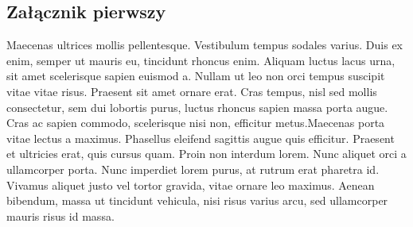 \documentclass[polish,engineering]{wizthesis}
\begin{document}
\listoffigures

\listoftables

\listoflistings

\begin{appendices}

\chapter{Załącznik pierwszy}

Maecenas ultrices mollis pellentesque. Vestibulum tempus sodales varius. Duis ex
enim, semper ut mauris eu, tincidunt rhoncus enim. Aliquam luctus lacus urna,
sit amet scelerisque sapien euismod a. Nullam ut leo non orci tempus suscipit
vitae vitae risus. Praesent sit amet ornare erat. Cras tempus, nisl sed mollis
consectetur, sem dui lobortis purus, luctus rhoncus sapien massa porta augue.
Cras ac sapien commodo, scelerisque nisi non, efficitur metus.Maecenas porta
vitae lectus a maximus. Phasellus eleifend sagittis augue quis efficitur.
Praesent et ultricies erat, quis cursus quam. Proin non interdum lorem. Nunc
aliquet orci a ullamcorper porta. Nunc imperdiet lorem purus, at rutrum erat
pharetra id. Vivamus aliquet justo vel tortor gravida, vitae ornare leo maximus.
Aenean bibendum, massa ut tincidunt vehicula, nisi risus varius arcu, sed
ullamcorper mauris risus id massa.


\end{appendices}
\end{document}
